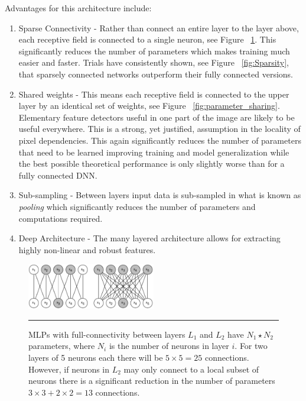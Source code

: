 Advantages for this architecture include\citep{lecun2015deep}:
\begin{enumerate}
\item Sparse Connectivity - Rather than connect an entire layer to the layer above, each receptive field is connected to a single neuron, see Figure ~\ref{fig:sparse_vs_fully_connected}.
This significantly reduces the number of parameters which makes training much easier\citep{bengio2009advances} and faster.
Trials have consistently shown, see Figure ~\ref{fig:Sparsity}, that sparsely connected networks outperform their fully connected versions.
\item Shared weights - This means each receptive field is connected to the upper layer by an identical set of weights\citep{krizhevsky2012imagenet}\citep{lecun1995convolutional}, see Figure ~\ref{fig:parameter_sharing}.
Elementary feature detectors useful in one part of the image are likely to be useful everywhere\citep{lecun1995convolutional}.
This is a strong, yet justified, assumption in the locality of pixel dependencies.
This again significantly reduces the number of parameters that need to be learned improving training\citep{mo2012survey}\citep{bengio2009advances} and model generalization while the best possible theoretical performance is only slightly worse than for a fully connected DNN\citep{krizhevsky2012imagenet}\citep{lecun1995convolutional}.
\item Sub-sampling - Between layers input data is sub-sampled in what is known as \textit{pooling} which significantly reduces the number of parameters and computations required\citep{bengio2009advances}\citep{chen2014big}\citep{ciresan2012multi}.
\item Deep Architecture  - The many layered architecture allows for extracting highly non-linear and robust features.
\end{enumerate}
\begin{figure}[htbp]
	\centering
		\includegraphics[width = 0.5\textwidth]{./Figures/Spars_verse_fully_connected_DL_textbook.jpg} %
		\rule{35em}{0.5pt}
	\caption[Sparse Connectivity]{MLPs with full-connectivity between layers $L_1$ and $L_2$ have $N_1 \star N_2$ parameters, where $N_i$ is the number of neurons in layer $i$. For two layers of 5 neurons each there will be $ 5 \times 5 = 25$ connections. However, if neurons in $L_2$ may only connect to a local subset of neurons there is a significant reduction in the number of parameters $ 3 \times 3 + 2 \times 2 = 13 $ connections.}
	\label{fig:sparse_vs_fully_connected}
\end{figure}
